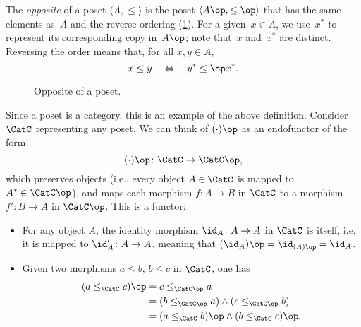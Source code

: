 \begin{example}
    The \emph{opposite} of a  poset $\langle A, \leq \rangle $ is the poset $\langle A\op, \leq\op\rangle $ that has the same elements as~$A$ and the reverse ordering (\cref{fig:opposite}).
    For a given~$x \in A$, we use~$x^*$ to represent its corresponding copy in~$A\op$;
    note that~$x$ and~$x^*$ are distinct.
    Reversing the order means that, for all $x,y\in A$,
    \begin{equation}
        x \leq y \quad \Leftrightarrow \quad y^* \leq\op x^*.
    \end{equation}
    \begin{figure}[tbh]
   \centering
   \caption{Opposite of a poset.\label{fig:opposite}}
\end{figure}
Since a poset is a category, this is an example of the above definition. Consider $\CatC$ representing any poset. We can think of $(\cdot)\op$ as an endofunctor of the form
\begin{equation}
    (\cdot)\op\colon \CatC \to \CatC\op,
\end{equation}
which preserves objects (i.e., every object $A \in \CatC$ is mapped to $A^*\in \CatC\op$), and maps each morphism $f\colon A\to B$ in $\CatC$ to a morphism $f'\colon B\to A$ in $\CatC\op$. This is a functor:
\begin{itemize}
    \item For any object $A$, the identity morphism $\id_A\colon A\to A$ in $\CatC$ is itself, i.e. it is mapped to $\id_A'\colon A\to A$, meaning that $(\id_A)\op=\id_{(A)\op}=\id_A$.
    \item Given two morphisms $a\leq b$, $b\leq c$ in $\CatC$, one has
    \begin{equation}
        \begin{aligned}
        (a\leq_{\CatC} c)\op &=c\leq_{\CatC\op} a\\
        &=(b\leq_{\CatC\op} a)\wedge (c\leq_{\CatC\op}b)\\
        &=(a\leq_{\CatC} b)\op \wedge (b\leq_{\CatC} c)\op.
        \end{aligned}
    \end{equation}
\end{itemize}
\end{example}


